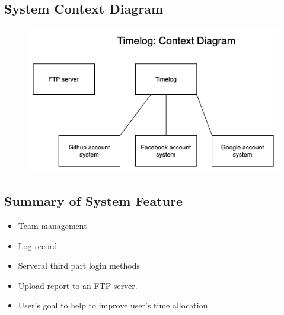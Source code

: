 \documentclass[12pt, a4paper]{article}
\begin{document}
\begin{CJK*}{UTF8}{bkai}
  \newpage

  \subsection{System Context Diagram}
    \begin{figure}[!htbp]
      \centering
      \includegraphics[width=\linewidth]{img/Context_Diagram.png}
    \end{figure}

  \subsection{Summary of System Feature}
    \begin{itemize}
      \item Team management
      \item Log record
      \item Serveral third part login methods
      \item Upload report to an FTP server.
      \item User's goal to help to improve user's time allocation.
    \end{itemize}

  \newpage


\end{CJK*}
\end{document}
